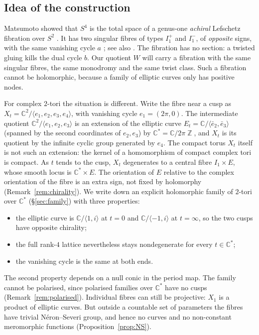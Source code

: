 \documentclass{article}
\DeclareMathOperator{\Z}{\mathbb{Z}}
\theoremstyle{definition}
\theoremstyle{plain}
\newcommand{\C}{\mathbb{C}}
\newcommand{\eb}{\bar e}
\begin{document}
\subsection{Idea of the construction}
Matsumoto showed that $S^4$ is the total space of a genus-one \emph{achiral}
Lefschetz fibration over $S^2$ \cite{Matsumoto82}. It has two singular fibres of types
$I_1^+$ and $I_1^-$, of \emph{opposite} signs, with the same vanishing cycle $a$
\cite[Thm.~4.2]{Matsumoto85}; see also \cite[Ex.~8.4.7]{GompfStipsicz99}. The fibration
has no section: a twisted gluing kills the dual cycle $b$. Our quotient $W$ will carry
a fibration with the same singular fibres, the same monodromy and the same twist
class. Such a fibration
cannot be holomorphic, because a family of elliptic curves only has positive nodes.

For complex $2$-tori the situation is different. Write the fibre near a cusp as
$X_t=\C^2/\langle e_1,e_2,e_3,e_4\rangle$, with vanishing cycle $e_1=(2\pi,0)$. The
intermediate quotient $\C^2/\langle e_1,e_2,e_3\rangle$ is an extension of the
elliptic curve $E_t=\C/\langle\eb_2,\eb_3\rangle$ (spanned by the second coordinates
of $e_2,e_3$) by $\C^*=\C/2\pi\Z$, and $X_t$ is its quotient by the infinite cyclic
group generated by $e_4$. The compact torus $X_t$ itself is not such an extension: the
kernel of a homomorphism of compact complex tori is compact. As $t$ tends to the cusp,
$X_t$ degenerates to a central fibre $I_1\times E$, whose smooth locus is
$\C^*\times E$. The orientation of $E$ relative to the complex orientation of the
fibre is an extra sign, not fixed by holomorphy
(Remark~\ref{rem:chirality}). We write down an explicit holomorphic family of
$2$-tori over $\C^*$ (\S\ref{sec:family}) with three properties:
\begin{itemize}
\item the elliptic curve is $\C/\langle 1,i\rangle$ at $t=0$ and
  $\C/\langle -1,i\rangle$ at $t=\infty$, so the two cusps have opposite
  chirality;
\item the full rank-$4$ lattice nevertheless stays nondegenerate for every
  $t\in\C^*$;
\item the vanishing cycle is the same at both ends.
\end{itemize}
The second property depends on a null conic in the period map. The family cannot be
polarised, since polarised families over $\C^*$ have no cusps
(Remark~\ref{rem:polarised}). Individual fibres can still be projective: $X_1$ is a
product of elliptic curves. But outside a countable set of parameters the fibres
have trivial N\'eron--Severi group, and hence no curves and no non-constant
meromorphic functions (Proposition~\ref{prop:NS}).
\end{document}
